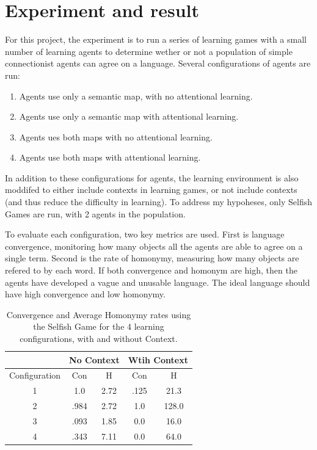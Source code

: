 \documentclass[a4paper,11pt]{article}
\begin{document}
\section{Experiment and result}
For this project, the experiment is to run a series of learning games with a
small number of learning agents to determine wether or not a population of simple connectionist
agents can agree on a language.  Several configurations of agents are run:

{\small
\begin{enumerate}

\item Agents use only a semantic map, with no attentional learning.

\item Agents use only a semantic map with attentional learning.

\item Agents ues both maps with no attentional learning.

\item Agents use both maps with attentional learning.

\end{enumerate}
}

In addition to these configurations for agents, the learning environment is
also moddifed to either include contexts in learning games, or not include
contexts (and thus reduce the difficulty in learning).  To address my 
hypoheses, only Selfish Games are run, with 2 agents in the
population.

To evaluate each configuration, two key metrics are used.  First is language
convergence, monitoring how many objects all the agents are able to agree on a
single term.  Second is the rate of homonymy, measuring how many objects are
refered to by each word.  If both convergence and homonym are high, then the
agents have developed a vague and unusable language.  The ideal language should
have high convergence and low homonymy.  

\begin{center}
\begin{table}
\begin{tabular}[ht]{ | c | c | c | c | c |}
\hline
 & \multicolumn{2}{|c|}{No Context} & \multicolumn{2}{|c|}{Wtih Context} \\
 \hline
 Configuration & Con & H& Con & H \\
 \hline
 1 & 1.0 & 2.72 & .125 & 21.3 \\
 2 & .984 & 2.72 & 1.0 & 128.0 \\
 3 & .093 & 1.85 & 0.0 & 16.0 \\
 4 & .343 & 7.11 & 0.0 & 64.0 \\
 \hline
\end{tabular}
\caption{Convergence and Average Homonymy rates using the Selfish Game  for the 4 learning
configurations, with and without Context.}  
\label{tb:game-result}
\end{table}
\end{center}
\end{document}
